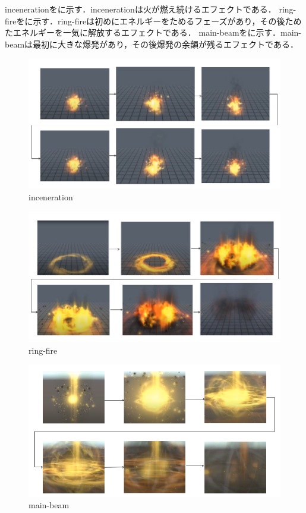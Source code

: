 incenerationをに示す．incenerationは火が燃え続けるエフェクトである．
ring-fireをに示す．ring-fireは初めにエネルギーをためるフェーズがあり，その後ためたエネルギーを一気に解放するエフェクトである．
main-beamをに示す．main-beamは最初に大きな爆発があり，その後爆発の余韻が残るエフェクトである．

\begin{figure}[h]
\centering
\includegraphics[clip,width=14cm]{./fig/fireTime.png}
\caption{inceneration}\label{fire}
\end{figure}

\begin{figure}[h]
\centering
\includegraphics[clip,width=14cm]{./fig/ringfireTime.png}
\caption{ring-fire}\label{ringfire}
\end{figure}

\begin{figure}[h]
    \centering
    \includegraphics[clip,width=14cm]{./fig/mainbeamTime.png}
    \caption{main-beam}\label{explosion}
    \end{figure}


